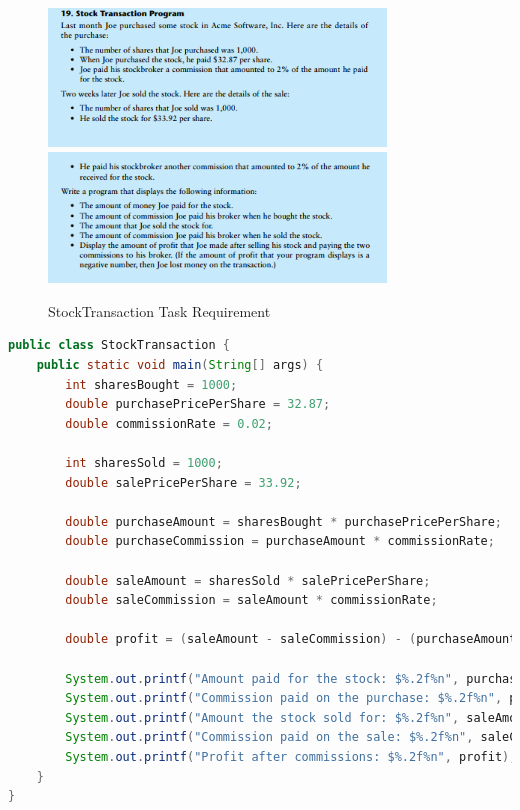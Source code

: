 \documentclass{article}
\begin{document}
\begin{figure}[H]
    \centering
    \includegraphics[width=0.8\textwidth]{./Assets/Task requirements/Assignment2/2.19.1.png}
    \includegraphics[width=0.8\textwidth]{./Assets/Task requirements/Assignment2/2.19.2.png}
    \caption{StockTransaction Task Requirement}
\end{figure}

\begin{lstlisting}[language=Java, caption=StockTransaction.java]
public class StockTransaction {
    public static void main(String[] args) {
        int sharesBought = 1000;
        double purchasePricePerShare = 32.87;
        double commissionRate = 0.02;
        
        int sharesSold = 1000;
        double salePricePerShare = 33.92;

        double purchaseAmount = sharesBought * purchasePricePerShare;
        double purchaseCommission = purchaseAmount * commissionRate;

        double saleAmount = sharesSold * salePricePerShare;
        double saleCommission = saleAmount * commissionRate;

        double profit = (saleAmount - saleCommission) - (purchaseAmount + purchaseCommission);

        System.out.printf("Amount paid for the stock: $%.2f%n", purchaseAmount);
        System.out.printf("Commission paid on the purchase: $%.2f%n", purchaseCommission);
        System.out.printf("Amount the stock sold for: $%.2f%n", saleAmount);
        System.out.printf("Commission paid on the sale: $%.2f%n", saleCommission);
        System.out.printf("Profit after commissions: $%.2f%n", profit);
    }
}
\end{lstlisting}
\end{document}
